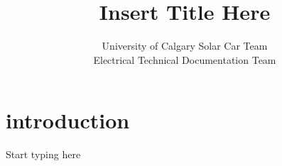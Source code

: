 \documentclass[titlepage]{article}
\title{Insert Title Here}
\author{University of Calgary Solar Car Team\\
        Electrical Technical Documentation Team}
\date{}
\begin{document}
    \maketitle
    \section{introduction}
    Start typing here
\end{document}
